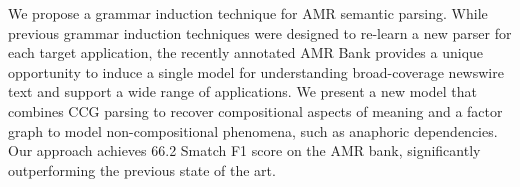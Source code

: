 We propose a grammar induction technique for AMR semantic parsing. While previous grammar induction techniques were designed to re-learn a new parser for each target application, the recently annotated AMR Bank provides a unique opportunity to induce a single model for understanding broad-coverage newswire text and support a wide range of applications. We present a new model that combines CCG parsing to recover compositional aspects of meaning and a factor graph to model non-compositional phenomena, such as anaphoric dependencies. Our approach achieves 66.2 Smatch F1 score on the AMR bank, significantly outperforming the previous state of the art.
